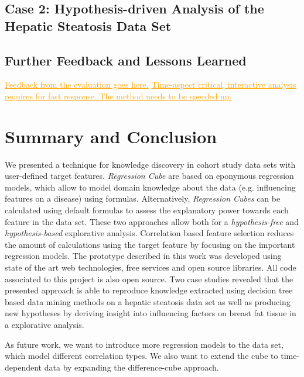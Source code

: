\documentclass[journal]{style/vgtc} 			          %
\newcommand{\com}[1]{\textcolor{orange}{\uline{#1}}}
\begin{document}
\subsection{Case 2: Hypothesis-driven Analysis of the Hepatic Steatosis Data Set}
\subsection{Further Feedback and Lessons Learned} \label{Lessons Learned}
\com{Feedback from the evaluation goes here.}
\com{Time-aspect critical, interactive analysis requires for fast response. The method needs to be speeded up.}

\section{Summary and Conclusion}
We presented a technique for knowledge discovery in cohort study data sets with user-defined target features.
\emph{Regression Cube} are based on eponymous regression models, which allow to model domain knowledge about the data (e.g. influencing features on a disease) using formulas.
Alternatively, \emph{Regression Cubes} can be calculated using default formulas to assess the explanatory power towards each feature in the data set.
These two approaches allow both for a \emph{hypothesis-free} and \emph{hypothesis-based} explorative analysis.
Correlation based feature selection reduces the amount of calculations using the target feature by focusing on the important regression models.
The prototype described in this work was developed using state of the art web technologies, free services and open source libraries.
All code associated to this project is also open source.
Two case studies revealed that the presented approach is able to reproduce knowledge extracted using decision tree based data mining methods on a hepatic steatosis data set as well as producing new hypotheses by deriving insight into influencing factors on breast fat tissue in a explorative analysis.

As future work, we want to introduce more regression models to the data set, which model different correlation types.
We also want to extend the cube to time-dependent data by expanding the difference-cube approach.
\end{document}
